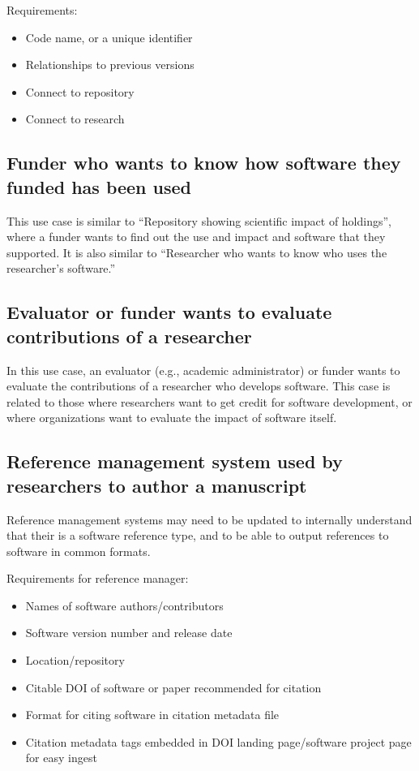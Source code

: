 \documentclass[12pt, oneside]{amsart}
\begin{document}
Requirements:
\begin{itemize}
\item Code name, or a unique identifier
\item Relationships to previous versions
\item Connect to repository
\item Connect to research
\end{itemize}

\subsection{Funder who wants to know how software they funded has been used}

This use case is similar to ``Repository showing scientific impact of holdings'',
where a funder wants to find out the use and impact and software that they
supported.  It is also similar to ``Researcher who wants to know who uses the researcher's software.''


\subsection{Evaluator or funder wants to evaluate contributions of a researcher}

In this use case, an evaluator (e.g., academic administrator) or funder wants
to evaluate the contributions of a researcher who develops software. This case
is related to those where researchers want to get credit for software
development, or where organizations want to evaluate the impact of software
itself.

\subsection{Reference management system used by researchers to author a manuscript}

Reference management systems may need to be updated to internally understand that their is a software reference type, and to be able to output references to software in common formats.

Requirements for reference manager:
\begin{itemize}
\item Names of software authors/contributors
\item Software version number and release date
\item Location/repository
\item Citable DOI of software or paper recommended for citation
\item Format for citing software in citation metadata file
\item Citation metadata tags embedded in DOI landing page/software project page for easy ingest
\end{itemize}
\end{document}

